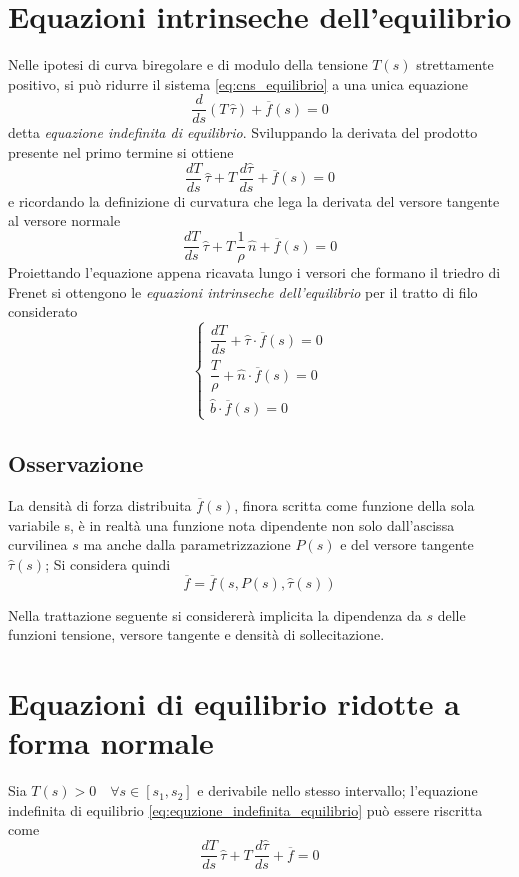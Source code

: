\section{Equazioni intrinseche dell'equilibrio}
Nelle ipotesi di curva biregolare  e di modulo della tensione  $T(s)$ strettamente positivo,  si può ridurre il sistema \eqref{eq:cns_equilibrio} a una unica equazione
\begin{equation}
	\label{eq:equzione_indefinita_equilibrio}
	\dfrac{d}{ds}(T\,\hat{\tau}) + \overline{f}(s) = 0
\end{equation}
detta \emph{equazione indefinita di equilibrio}. Sviluppando la derivata del prodotto presente nel primo termine si ottiene
\[
	\dfrac{dT}{ds}\,\hat{\tau} + T\,\dfrac{d\hat{\tau}}{ds} + \overline{f}(s) = 0
\]
e ricordando la definizione di curvatura che lega la derivata del versore tangente al versore normale
\[
	\dfrac{dT}{ds}\,\hat{\tau} + T\,\dfrac{1}{\rho}\,\hat{n} + \overline{f}(s) = 0
\]
Proiettando l'equazione appena ricavata lungo i versori che formano il triedro di Frenet si ottengono le \emph{equazioni intrinseche dell'equilibrio} per il tratto di filo considerato
\begin{equation}
	\begin{cases}
		\dfrac{dT}{ds} + \hat{\tau}\cdot \overline{f}(s)=0\\[2ex]
		\dfrac{T}{\rho} + \hat{n}\cdot \overline{f}(s)=0\\[2ex]
		\hat{b}\cdot \overline{f}(s)=0
	\end{cases}
\end{equation}

\subsection*{Osservazione}
La densità di forza distribuita $\overline{f}(s)$, finora scritta come funzione della sola variabile s, è in realtà una funzione nota dipendente non solo dall'ascissa curvilinea $s$ ma anche dalla parametrizzazione $P(s)$ e del versore tangente $\hat{\tau}(s)$; Si considera quindi
\[
\overline{f} = \overline{f}	(s, P(s), \hat{\tau}(s))
\]

Nella trattazione seguente si considererà implicita la dipendenza da $s$ delle funzioni tensione, versore tangente e densità di sollecitazione.

\section{Equazioni di equilibrio ridotte a forma normale}
Sia $T(s)>0\quad\forall s \in[s_1, s_2]$ e derivabile nello stesso intervallo; l'equazione indefinita di equilibrio \eqref{eq:equzione_indefinita_equilibrio} può essere riscritta come
\begin{equation}
	\label{eq:equazione_indefinita_equilibrio_1}
	\dfrac{dT}{ds}\,\hat{\tau} + T\,\dfrac{d\hat{\tau}}{ds}+ \overline{f} = 0
\end{equation}


